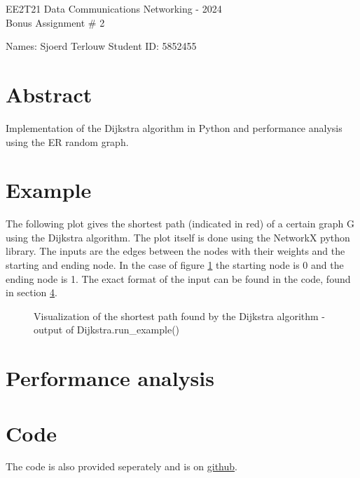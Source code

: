 \documentclass[11pt,fleqn]{article}
\begin{document}
	\begin{center}
		{\Large EE2T21 Data Communications Networking - 2024\\[0.1em]
			Bonus Assignment \# 2 \\}
	\end{center}

    \parbox[l][17mm][t]{\textwidth}{Names: Sjoerd Terlouw \hspace{6.66cm}
			Student ID: 5852455}
	\section{Abstract}
    Implementation of the Dijkstra algorithm in Python and performance analysis using the ER random graph.

    \section{Example}
    The following plot gives the shortest path (indicated in red) of a certain graph G using the Dijkstra algorithm. The plot itself is done using the NetworkX python library. 
    The inputs are the edges between the nodes with their weights and the starting and ending node. In the case of figure \ref{fig:example} the starting node is 0 and the ending node is 1.
    The exact format of the input can be found in the code, found in section \ref{section:code}.
    \begin{figure}[H]
        \centering
        
        \caption{Visualization of the shortest path found by the Dijkstra algorithm - output of Dijkstra.run\_example()}
        \label{fig:example}
    \end{figure}

    \section{Performance analysis}
    
    \section{Code}
    \label{section:code}
    The code is also provided seperately and is on \href{https://github.com/SjdTl/DCN-Bonus-Assignment-2.git}{\color{blue}github}.
    \inputminted[breaklines=true]{python3}{Dijkstra.py}
\end{document}
